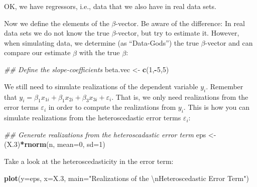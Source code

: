 \documentclass[]{book}
\newenvironment{Shaded}{\begin{snugshade}}{\end{snugshade}}
\newcommand{\CharTok}[1]{\textcolor[rgb]{0.31,0.60,0.02}{#1}}
\newcommand{\CommentTok}[1]{\textcolor[rgb]{0.56,0.35,0.01}{\textit{#1}}}
\newcommand{\DataTypeTok}[1]{\textcolor[rgb]{0.13,0.29,0.53}{#1}}
\newcommand{\DecValTok}[1]{\textcolor[rgb]{0.00,0.00,0.81}{#1}}
\newcommand{\FloatTok}[1]{\textcolor[rgb]{0.00,0.00,0.81}{#1}}
\newcommand{\KeywordTok}[1]{\textcolor[rgb]{0.13,0.29,0.53}{\textbf{#1}}}
\newcommand{\NormalTok}[1]{#1}
\newcommand{\OperatorTok}[1]{\textcolor[rgb]{0.81,0.36,0.00}{\textbf{#1}}}
\newcommand{\StringTok}[1]{\textcolor[rgb]{0.31,0.60,0.02}{#1}}
\theoremstyle{definition}
\theoremstyle{definition}
\theoremstyle{definition}
\theoremstyle{remark}
\begin{document}
OK, we have regressors, i.e., data that we also have in real data sets.

Now we define the elements of the \(\beta\)-vector. Be aware of the difference: In real data sets we do not know the true \(\beta\)-vector, but try to estimate it. However, when simulating data, we determine (as ``Data-Gods'') the true \(\beta\)-vector and can compare our estimate \(\hat{\beta}\) with the true \(\beta\):

\begin{Shaded}
\begin{Highlighting}[]
\CommentTok{## Define the slope-coefficients}
\NormalTok{beta.vec  <-}\StringTok{ }\KeywordTok{c}\NormalTok{(}\DecValTok{1}\NormalTok{,}\OperatorTok{-}\DecValTok{5}\NormalTok{,}\DecValTok{5}\NormalTok{)}
\end{Highlighting}
\end{Shaded}

We still need to simulate realizations of the dependent variable \(y_i\). Remember that \(y_i=\beta_1 x_{1i}+\beta_1 x_{2i}+\beta_3 x_{3i}+\varepsilon_{i}\). That is, we only need realizations from the error terms \(\varepsilon_i\) in order to compute the realizations from \(y_i\). This is how you can simulate realizations from the heteroscedastic error terms \(\varepsilon_i\):

\begin{Shaded}
\begin{Highlighting}[]
\CommentTok{## Generate realizations from the heteroscadastic error term}
\NormalTok{eps       <-}\StringTok{ }\NormalTok{(X}\FloatTok{.3}\NormalTok{)}\OperatorTok{*}\KeywordTok{rnorm}\NormalTok{(n, }\DataTypeTok{mean=}\DecValTok{0}\NormalTok{, }\DataTypeTok{sd=}\DecValTok{1}\NormalTok{)}
\end{Highlighting}
\end{Shaded}

Take a look at the heteroscedasticity in the error term:

\begin{Shaded}
\begin{Highlighting}[]
\KeywordTok{plot}\NormalTok{(}\DataTypeTok{y=}\NormalTok{eps, }\DataTypeTok{x=}\NormalTok{X}\FloatTok{.3}\NormalTok{, }
     \DataTypeTok{main=}\StringTok{"Realizations of the }\CharTok{\textbackslash{}n}\StringTok{Heteroscedastic Error Term"}\NormalTok{)}
\end{Highlighting}
\end{Shaded}
\end{document}
